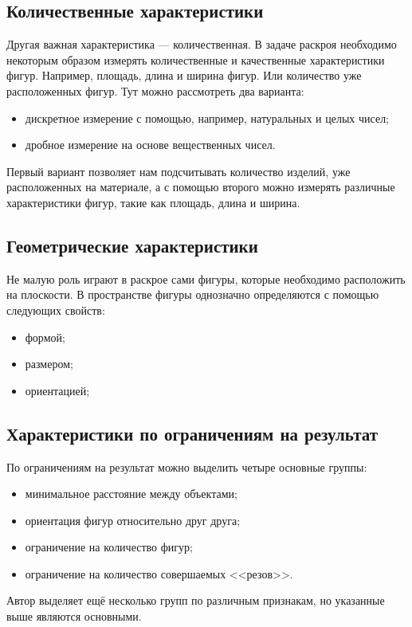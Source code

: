 \documentclass[14pt]{extarticle}
\begin{document}
	\subsection{Количественные характеристики}
	Другая важная характеристика --- количественная. В задаче раскроя необходимо
	некоторым образом измерять количественные и качественные характеристики фигур.
	Например, площадь, длина и ширина фигур. Или количество уже расположенных фигур. Тут можно рассмотреть два варианта:
	\begin{itemize}
		\item дискретное измерение с помощью, например, натуральных и целых чисел;
		\item дробное измерение на основе вещественных чисел.
	\end{itemize}


	Первый вариант позволяет нам подсчитывать количество изделий, уже расположенных
	на материале, а с помощью второго можно измерять различные характеристики фигур, 	такие как площадь, длина и ширина.
	\subsection{Геометрические характеристики}
	Не малую роль играют в раскрое сами фигуры, которые необходимо расположить
	на плоскости. В пространстве фигуры однозначно определяются с помощью следующих
	свойств:
	\begin{itemize}
		\item формой;
		\item размером;
		\item ориентацией;
	\end{itemize}
	\subsection{Характеристики по ограничениям на результат}
	По ограничениям на результат можно выделить четыре основные группы:
	\begin{itemize}
		\item  минимальное расстояние между объектами;
		\item ориентация фигур относительно друг друга;
		\item ограничение на количество фигур;
		\item ограничение на количество совершаемых <<резов>>.
	\end{itemize}


	Автор \cite{Dyckhoff} выделяет ещё несколько групп по различным признакам, но указанные выше являются основными.
\end{document}
